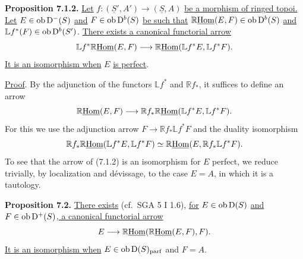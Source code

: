\textbf{Proposition 7.1.2.} \uline{Let} \(f:(\underline{S}',A')\longrightarrow(\underline{S},A)\) \uline{be a morphism of ringed topoi. Let} \(E\in\operatorname{ob}\mathrm D^-(S)\) \uline{and} \(F\in\operatorname{ob}\mathrm D^b(S)\) \uline{be such that} \(\mathbb{R}\underline{\operatorname{Hom}}(E,F)\in\operatorname{ob}\mathrm D^b(S)\) \uline{and} \(\mathbb{L}f^*(F)\in\operatorname{ob}\mathrm D^b(S')\). \uline{There exists a canonical functorial arrow}
\[
  \mathbb{L}f^*\mathbb{R}\underline{\operatorname{Hom}}(E,F)
  \longrightarrow
  \mathbb{R}\underline{\operatorname{Hom}}(\mathbb{L}f^*E,\mathbb{L}f^*F).
\]
\uline{It is an isomorphism when} \(E\) \uline{is perfect}.

\uline{Proof}. By the adjunction of the functors \(\mathbb{L}f^*\) and \(\mathbb{R}f_*\), it suffices to define an arrow
\[
  \mathbb{R}\underline{\operatorname{Hom}}(E,F)
  \longrightarrow
  \mathbb{R}f_*\mathbb{R}\underline{\operatorname{Hom}}(\mathbb{L}f^*E,\mathbb{L}f^*F).
\]
For this we use the adjunction arrow \(F\to\mathbb{R}f_*\mathbb{L}f^*F\) and the duality isomorphism
\[
  \mathbb{R}f_*\mathbb{R}\underline{\operatorname{Hom}}(\mathbb{L}f^*E,\mathbb{L}f^*F)
  \simeq
  \mathbb{R}\underline{\operatorname{Hom}}(E,\mathbb{R}f_*\mathbb{L}f^*F).
\]
To see that the arrow of (7.1.2) is an isomorphism for \(E\) perfect, we reduce trivially, by localization and dévissage, to the case \(E=A\), in which it is a tautology.

\textbf{Proposition 7.2.} \uline{There exists} (cf.\ SGA 5 I 1.6), \uline{for} \(E\in\operatorname{ob}\mathrm D(S)\) \uline{and} \(F\in\operatorname{ob}\mathrm D^+(S)\)\uline{, a canonical functorial arrow}
\[
  E\longrightarrow\mathbb{R}\underline{\operatorname{Hom}}(\mathbb{R}\underline{\operatorname{Hom}}(E,F),F).
\]
\uline{It is an isomorphism when} \(E\in\operatorname{ob}\mathrm D(S)_{\mathrm{parf}}\) and \(F=A\).

